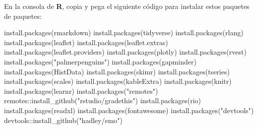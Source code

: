 \documentclass[
  letterpaper,
  DIV=11,
  numbers=noendperiod]{scrartcl}
\newenvironment{Shaded}{\begin{snugshade}}{\end{snugshade}}
\newcommand{\FunctionTok}[1]{\textcolor[rgb]{0.28,0.35,0.67}{#1}}
\newcommand{\NormalTok}[1]{\textcolor[rgb]{0.00,0.23,0.31}{#1}}
\newcommand{\SpecialCharTok}[1]{\textcolor[rgb]{0.37,0.37,0.37}{#1}}
\newcommand{\StringTok}[1]{\textcolor[rgb]{0.13,0.47,0.30}{#1}}
\begin{document}
En la consola de \textbf{R}, copia y pega el siguiente código para
instalar estos paquetes de paquetes:

\begin{Shaded}
\begin{Highlighting}[]
\FunctionTok{install.packages}\NormalTok{(}\StringTok{\textquotesingle{}rmarkdown\textquotesingle{}}\NormalTok{) }
\FunctionTok{install.packages}\NormalTok{(}\StringTok{\textquotesingle{}tidyverse\textquotesingle{}}\NormalTok{)}
\FunctionTok{install.packages}\NormalTok{(}\StringTok{\textquotesingle{}rlang\textquotesingle{}}\NormalTok{)}
\FunctionTok{install.packages}\NormalTok{(}\StringTok{\textquotesingle{}leaflet\textquotesingle{}}\NormalTok{) }
\FunctionTok{install.packages}\NormalTok{(}\StringTok{\textquotesingle{}leaflet.extras\textquotesingle{}}\NormalTok{) }
\FunctionTok{install.packages}\NormalTok{(}\StringTok{\textquotesingle{}leaflet.providers\textquotesingle{}}\NormalTok{) }
\FunctionTok{install.packages}\NormalTok{(}\StringTok{\textquotesingle{}plotly\textquotesingle{}}\NormalTok{)}
\FunctionTok{install.packages}\NormalTok{(}\StringTok{\textquotesingle{}rvest\textquotesingle{}}\NormalTok{)}
\FunctionTok{install.packages}\NormalTok{(}\StringTok{"palmerpenguins"}\NormalTok{)}
\FunctionTok{install.packages}\NormalTok{(}\StringTok{\textquotesingle{}gapminder\textquotesingle{}}\NormalTok{)}
\FunctionTok{install.packages}\NormalTok{(}\StringTok{\textquotesingle{}HistData\textquotesingle{}}\NormalTok{)}
\FunctionTok{install.packages}\NormalTok{(}\StringTok{\textquotesingle{}skimr\textquotesingle{}}\NormalTok{) }
\FunctionTok{install.packages}\NormalTok{(}\StringTok{\textquotesingle{}tseries\textquotesingle{}}\NormalTok{) }
\FunctionTok{install.packages}\NormalTok{(}\StringTok{\textquotesingle{}scales\textquotesingle{}}\NormalTok{) }
\FunctionTok{install.packages}\NormalTok{(}\StringTok{\textquotesingle{}kableExtra\textquotesingle{}}\NormalTok{) }
\FunctionTok{install.packages}\NormalTok{(}\StringTok{\textquotesingle{}knitr\textquotesingle{}}\NormalTok{) }
\FunctionTok{install.packages}\NormalTok{(}\StringTok{\textquotesingle{}learnr\textquotesingle{}}\NormalTok{)}
\FunctionTok{install.packages}\NormalTok{(}\StringTok{"remotes"}\NormalTok{)}
\NormalTok{remotes}\SpecialCharTok{::}\FunctionTok{install\_github}\NormalTok{(}\StringTok{"rstudio/gradethis"}\NormalTok{)}
\FunctionTok{install.packages}\NormalTok{(}\StringTok{\textquotesingle{}rio\textquotesingle{}}\NormalTok{)}
\FunctionTok{install.packages}\NormalTok{(}\StringTok{\textquotesingle{}readxl\textquotesingle{}}\NormalTok{)}
\FunctionTok{install.packages}\NormalTok{(}\StringTok{\textquotesingle{}fontawesome\textquotesingle{}}\NormalTok{)}
\FunctionTok{install.packages}\NormalTok{(}\StringTok{"devtools"}\NormalTok{)}
\NormalTok{devtools}\SpecialCharTok{::}\FunctionTok{install\_github}\NormalTok{(}\StringTok{"hadley/emo"}\NormalTok{)}
\end{Highlighting}
\end{Shaded}
\end{document}
